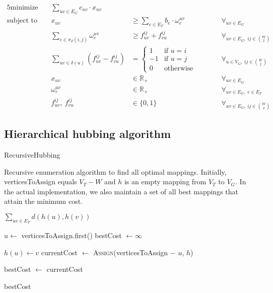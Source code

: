 \begin{alignat*}{5}
    \text{minimize}\ && \sum_{uv \in E_G} c_{uv} \cdot x_{uv} &&& \\
    \text{subject to}\ && x_{uv} &\ge \sum_{e \in E_T} b_e \cdot \omega_e^{uv} &&\qquad \forall_{uv \in E_G} \\
    && \sum_{e \in \pi_T(i,j)} \omega_e^{uv} &\ge f_{uv}^{ij} + f_{vu}^{ij} &&\qquad \forall_{uv \in E_G,\ ij \in \binom{W}{2}} \\
    && \sum_{uv \in \delta(u)} (f_{uv}^{ij} - f_{vu}^{ij}) &= \begin{cases}
                                                                1 & \text{if $u = i$} \\
                                                                -1 & \text{if $u = j$} \\
                                                                0 & \text{otherwise}
    \end{cases} &&\qquad \forall_{u \in V_G,\ ij \in \binom{W}{2}} \\
    && x_{uv} &\in \mathbb{R}_+ &&\qquad \forall_{uv \in E_G} \\
    && \omega_e^{uv} &\in \mathbb{R}_+ &&\qquad \forall_{uv \in E_G,\ e \in E_T} \\
    && f_{uv}^{ij},\ f_{vu}^{ij} &\in \{ 0, 1 \} &&\qquad \forall_{uv \in E_G,\ ij \in \binom{W}{2}}
\end{alignat*}

\subsection{Hierarchical hubbing algorithm}
\begin{algorithm}
    \caption{RecursiveHubbing}
    \label{alg:TriangulateStar}
    \begin{algorithmic}[1]
        \Statex Recursive enumeration algorithm to find all optimal mappings. Initially, verticesToAssign equals $V_T - W$ and $h$ is an empty mapping from $V_T$ to $V_G$. In the actual implementation, we also maintain a set of all best mappings that attain the minimum cost.

                \State \Return $\sum_{uv \in E_T} d(h(u), h(v))$ 
            \EndIf

            \State $u \gets$ verticesToAssign.first()
            \State bestCost $\gets \infty$

                \State $h(u) \gets v$
                \State currentCost $\gets$ \textsc{Assign}(verticesToAssign $-$ $u$, $h$)

                    \State bestCost $\gets$ currentCost
                \EndIf
            \EndFor

            \State \Return bestCost
        \EndProcedure
    \end{algorithmic}
\end{algorithm}

